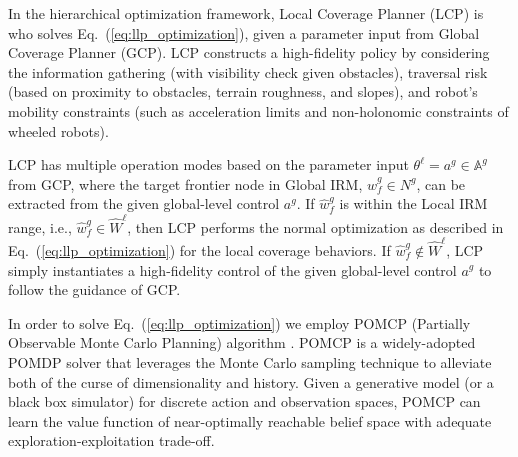 \documentclass[letterpaper]{article} %
\newcommand{\phdone}[1]{} %
\begin{document}
\phdone{LCP Functionality}
In the hierarchical optimization framework, Local Coverage Planner (LCP) is who solves Eq.~(\ref{eq:llp_optimization}), given a parameter input from Global Coverage Planner (GCP).
LCP constructs a high-fidelity policy by considering the information gathering (with visibility check given obstacles), traversal risk (based on proximity to obstacles, terrain roughness, and slopes), and robot's mobility constraints (such as acceleration limits and non-holonomic constraints of wheeled robots).


\phdone{LCP Problem Characteristics}
LCP has multiple operation modes based on the parameter input $\theta^\ell = a^g \in \mathbb{A}^g$ from GCP,
where the target frontier node in Global IRM, $\hat{w}^g_f \in N^g$, can be extracted from the given global-level control $a^g$.
%
If $\hat{w}^g_f$ is within the Local IRM range, i.e., $\hat{w}^g_f \in \hat{W}^\ell$, then LCP performs the normal optimization as described in Eq.~(\ref{eq:llp_optimization}) for the local coverage behaviors.
If $\hat{w}^g_f \notin \hat{W}^\ell$, LCP simply instantiates a high-fidelity control of the given global-level control $a^g$ to follow the guidance of GCP.





\phdone{POMDP Solver LCP}
In order to solve Eq.~(\ref{eq:llp_optimization}) we employ POMCP (Partially Observable Monte Carlo Planning) algorithm \cite{silver2010monte}.
POMCP is a widely-adopted POMDP solver that leverages the Monte Carlo sampling technique to alleviate both of the curse of dimensionality and history.
Given a generative model (or a black box simulator) for discrete action and observation spaces, POMCP can learn the value function of near-optimally reachable belief space with adequate exploration-exploitation trade-off.
\end{document}
